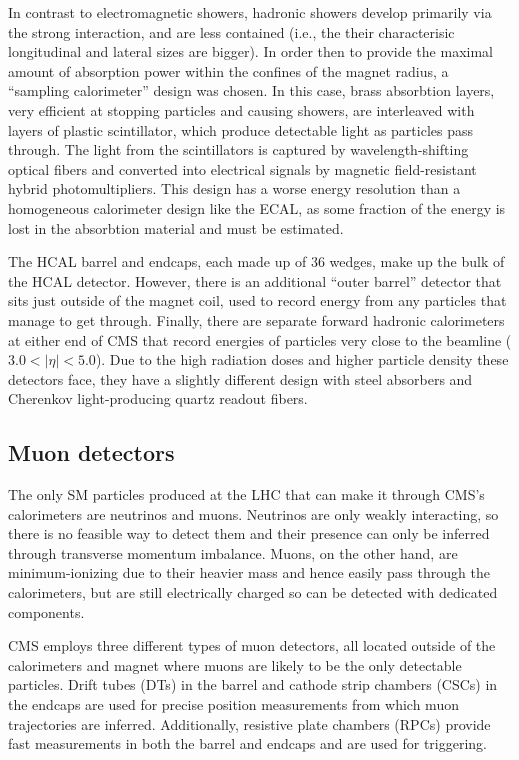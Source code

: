 In contrast to electromagnetic showers, hadronic showers develop primarily via the
strong interaction, and are less contained (i.e., the their characterisic longitudinal
and lateral sizes are bigger). In order then to provide the maximal amount of absorption
power within the confines of the magnet radius, a ``sampling calorimeter'' design
was chosen. In this case, brass absorbtion layers, very efficient at stopping particles
and causing showers, are interleaved with layers of plastic scintillator, which
produce detectable light as particles pass through. The light from the scintillators
is captured by wavelength-shifting optical fibers
and converted into electrical signals by magnetic field-resistant hybrid photomultipliers.
This design has a worse energy resolution than a homogeneous calorimeter design like the ECAL, as some 
fraction of the energy is lost in the absorbtion material and must be estimated.

The HCAL barrel and endcaps, each made up of 36 wedges, make up the bulk of the HCAL detector.
However, there is an additional ``outer barrel'' detector that sits just outside of the magnet
coil, used to record energy from any particles that manage to get through. Finally,
there are separate forward hadronic calorimeters at either end of CMS that record energies
of particles very close to the beamline ($3.0 < |\eta| < 5.0$). Due to the high radiation
doses and higher particle density these detectors face, they have a slightly different
design with steel absorbers and Cherenkov light-producing quartz readout fibers.


\subsection{Muon detectors}

The only SM particles produced at the LHC that can make it through CMS's calorimeters
are neutrinos and muons. Neutrinos are only weakly interacting, so there is no feasible way to
detect them and their presence can only be inferred through transverse momentum imbalance.
Muons, on the other hand, are minimum-ionizing due to their heavier mass and hence easily
pass through the calorimeters, but are still electrically charged so can be detected with
dedicated components.

CMS employs three different types of muon detectors, all located outside of the calorimeters
and magnet where muons are likely to be the only detectable particles. Drift tubes (DTs) in 
the barrel and cathode strip chambers (CSCs) in the endcaps are used for precise position
measurements from which muon trajectories are inferred. Additionally, resistive plate
chambers (RPCs) provide fast measurements in both the barrel and endcaps and are
used for triggering.

